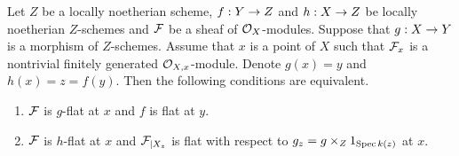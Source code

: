 \begin{theorem}
Let $Z$ be a locally noetherian scheme, $f:Y\rightarrow Z$ and $h:X\rightarrow Z$ be locally noetherian $Z$-schemes and ${\mathcal F}$ be a sheaf of ${\mathcal O}_X$-modules. Suppose that $g:X\rightarrow Y$ is a morphism of $Z$-schemes. Assume that $x$ is a point of $X$ such that ${\mathcal F}_x$ is a nontrivial finitely generated ${\mathcal O}_{X,x}$-module. Denote $g(x)=y$ and $h(x)=z=f(y)$. Then the following conditions are equivalent.
\begin{enumerate}[label=\emph{\textbf{(\arabic*)}}, leftmargin=*]
\item ${\mathcal F}$ is $g$-flat at $x$ and $f$ is flat at $y$.
\item ${\mathcal F}$ is $h$-flat at $x$ and ${\mathcal F}_{\mid X_z}$ is flat with respect to $g_z=g\times_Z1_{\mathrm{Spec}\, k(z)}$ at $x$.
\end{enumerate}
\end{theorem}
